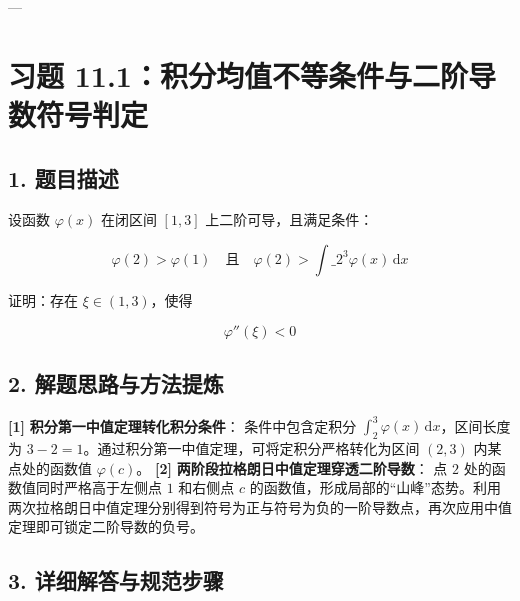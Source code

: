 \documentclass[11pt,a4paper,UTF8]{ctexart}
\begin{document}
\pagestyle{fancy}
\fancyhf{}
\fancyhead[R]{\small\color{TitlePurple}\nouppercase{\leftmark}}
\renewcommand{\headrulewidth}{0.5pt}

\tableofcontents
\newpage
{}


---


\section{习题 11.1：积分均值不等条件与二阶导数符号判定}


\subsection{1. 题目描述}
设函数 $\varphi(x)$ 在闭区间 $[1, 3]$ 上二阶可导，且满足条件：

\begin{equation*}
\varphi(2) > \varphi(1) \quad \text{且} \quad \varphi(2) > \int\_2^3 \varphi(x)\,\mathrm{d}x
\end{equation*}

证明：存在 $\xi \in (1, 3)$，使得

\begin{equation*}
\varphi''(\xi) < 0
\end{equation*}



\subsection{2. 解题思路与方法提炼}
\begin{solbox}[分步推导与答题规范]
\textbf{[1]}  \textbf{积分第一中值定理转化积分条件}：
条件中包含定积分 $\int_2^3 \varphi(x)\,\mathrm{d}x$，区间长度为 $3 - 2 = 1$。通过积分第一中值定理，可将定积分严格转化为区间 $(2, 3)$ 内某点处的函数值 $\varphi(c)$。
\textbf{[2]}  \textbf{两阶段拉格朗日中值定理穿透二阶导数}：
点 $2$ 处的函数值同时严格高于左侧点 $1$ 和右侧点 $c$ 的函数值，形成局部的“山峰”态势。利用两次拉格朗日中值定理分别得到符号为正与符号为负的一阶导数点，再次应用中值定理即可锁定二阶导数的负号。
\end{solbox}


\subsection{3. 详细解答与规范步骤}
\end{document}
